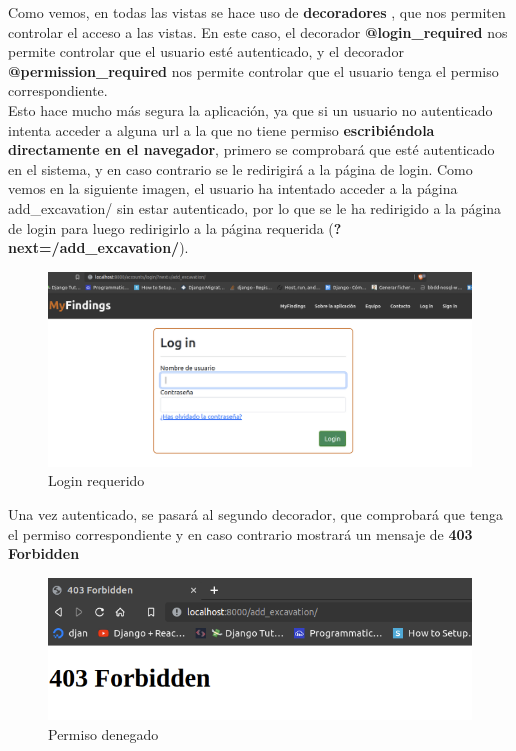 Como vemos, en todas las vistas se hace uso de \textbf{decoradores} \cite{decorators},
que nos permiten controlar el acceso a las vistas. En este caso, el decorador
\textbf{@login\_required} nos permite controlar que el usuario esté autenticado,
y el decorador \textbf{@permission\_required} nos permite controlar que el usuario
tenga el permiso correspondiente.\\

Esto hace mucho más segura la aplicación, ya que si un usuario no autenticado intenta
acceder a alguna url a la que no tiene permiso \textbf{escribiéndola directamente en
el navegador}, primero se comprobará que esté autenticado en el sistema, y en caso
contrario se le redirigirá a la página de login. Como vemos en la siguiente imagen,
el usuario ha intentado acceder a la página add\_excavation/ sin estar autenticado,
por lo que se le ha redirigido a la página de login para luego redirigirlo a la página
requerida (\textbf{?next=/add\_excavation/}).

    \begin{figure}[H]
        \centering
        \includegraphics[scale=0.25]{imagenes/login-required.png}
        \caption{Login requerido}
        \label{fig:login-required}
    \end{figure}


Una vez autenticado, se pasará al segundo decorador, que comprobará que tenga el permiso
correspondiente y en caso contrario mostrará un mensaje de \textbf{403 Forbidden}

    \begin{figure}[H]
        \centering
        \includegraphics[scale=0.50]{imagenes/403-forbidden.png}
        \caption{Permiso denegado}
        \label{fig:403-forbidden}
    \end{figure}

